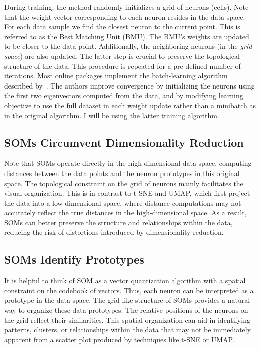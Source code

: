 During training, the method randomly initializes a grid of neurons (cells). Note that the weight vector corresponding to each neuron resides in the data-space. For each data sample we find the closest neuron to the current point. This is referred to as the Best Matching Unit (BMU). The BMU's weights are updated to be closer to the data point. Additionally, the neighboring neurons (in the \textit{grid-space}) are also updated. The latter step is crucial to preserve the topological structure of the data. This procedure is repeated for a pre-defined number of iterations. Most online packages implement the batch-learning algorithm described by~\cite{kinouchi2002quick}. The authors improve convergence by initializing the neurons using the first two eigenvectors computed from the data, and by modifying learning objective to use the full dataset in each weight update rather than a minibatch as in the original algorithm.  I will be using the latter training algorithm.

\subsection*{SOMs Circumvent Dimensionality Reduction}

Note that SOMs operate directly in the high-dimensional data space, computing distances between the data points and the neuron prototypes in this original space. The topological constraint on the grid of neurons mainly facilitates the visual organization. This is in contrast to t-SNE and UMAP, which first project the data into a low-dimensional space, where distance computations may not accurately reflect the true distances in the high-dimensional space. As a result, SOMs can better preserve the structure and relationships within the data, reducing the risk of distortions introduced by dimensionality reduction.

\subsection*{SOMs Identify Prototypes}
It is helpful to think of SOM as a vector quantization algorithm with a spatial constraint on the codebook of vectors. Thus, each neuron can be interpreted as a prototype in the data-space. The grid-like structure of SOMs provides a natural way to organize these data prototypes. The relative positions of the neurons on the grid reflect their similarities. This spatial organization can aid in identifying patterns, clusters, or relationships within the data that may not be immediately apparent from a scatter plot produced by techniques like t-SNE or UMAP.

